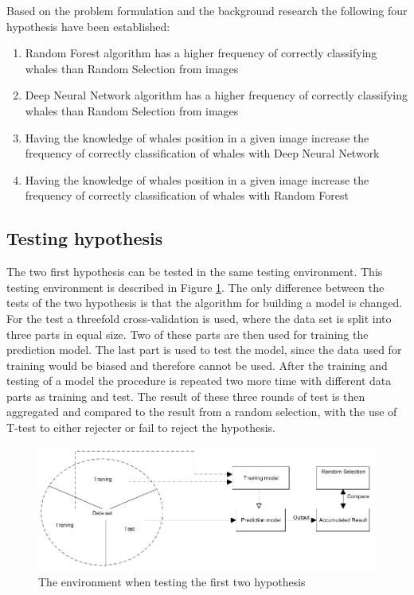 Based on the problem formulation and the background research the following four hypothesis have been established:
\begin{enumerate}
\item Random Forest algorithm has a higher frequency of correctly classifying whales than Random Selection from images
\item Deep Neural Network algorithm has a higher frequency of correctly classifying whales than Random Selection from images
\item Having the knowledge of whales position in a given image increase the frequency of correctly classification of whales with Deep Neural Network
\item Having the knowledge of whales position in a given image increase the frequency of correctly classification of whales with Random Forest
\end{enumerate}

\subsection{Testing hypothesis}
The two first hypothesis can be tested in the same testing environment. This testing environment is described in Figure \ref{fig:environmentRaw}. The only difference between the tests of the two hypothesis is that the algorithm for building a model is changed.
For the test a threefold cross-validation is used, where the data set is split into three parts in equal size. Two of these parts are then used for training the prediction model. The last part is used to test the model, since the data used for training would be biased and therefore cannot be used. After the training and testing of a model the procedure is repeated two more time with different data parts as training and test. 
The result of these three rounds of test is then aggregated and compared to the result from a random selection, with the use of T-test to either rejecter or fail to reject the hypothesis.

\begin{figure}
\centering
\includegraphics[width=\linewidth]{Images/EnvironmentOnRawData}
\caption{The environment when testing the first two hypothesis}
\label{fig:environmentRaw}
\end{figure}

